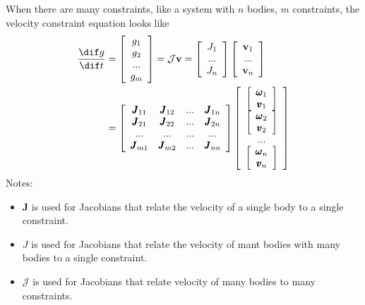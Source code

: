        When there are many constraints, like a system with $n$ bodies, $m$ constraints, the velocity constraint equation looks like
        \begin{equation}
            \begin{aligned}
            \frac{\dif g}{\dif t} &= \left[ \begin{array}{c} g_1 \\g_2 \\ ...\\g_m\end{array}\right]= \mathcal{J}\mathbf{v} = \left[ \begin{array}{c} J_1 \\ ... \\ J_n \end{array} \right] \left[ \begin{array}{c} \mathbf{v}_1 \\ ... \\ \mathbf{v}_n \end{array} \right] \\
            &= \left[ \begin{array}{cccc} \pmb{J}_{11} & \pmb{J}_{12} & ... & \pmb{J}_{1n} \\ \pmb{J}_{21} & \pmb{J}_{22} & ... & \pmb{J}_{2n} \\ ... & ... & ... & ... \\ \pmb{J}_{m1} & \pmb{J}_{m2} & ... & \pmb{J}_{nn}\end{array} \right] \left[\begin{array}{c}\left[\begin{array}{c}\pmb{\omega}_1 \\ \pmb{v}_1\end{array}\right] \\ \left[\begin{array}{c}\pmb{\omega}_2 \\ \pmb{v}_2\end{array}\right] \\ ... \\ \left[\begin{array}{c}\pmb{\omega}_n \\ \pmb{v}_n\end{array}\right]\end{array}\right]
            \end{aligned} 
        \end{equation}
        Notes:
        \begin{itemize}
            \item $\pmb{J}$ is used for Jacobians that relate the velocity of a single body to a single constraint.
            \item $J$ is used for Jacobians that relate the velocity of mant bodies with many bodies to a single constraint.
            \item $\mathcal{J}$ is used for Jacobians that relate velocity of many bodies to many constraints. 
        \end{itemize}

